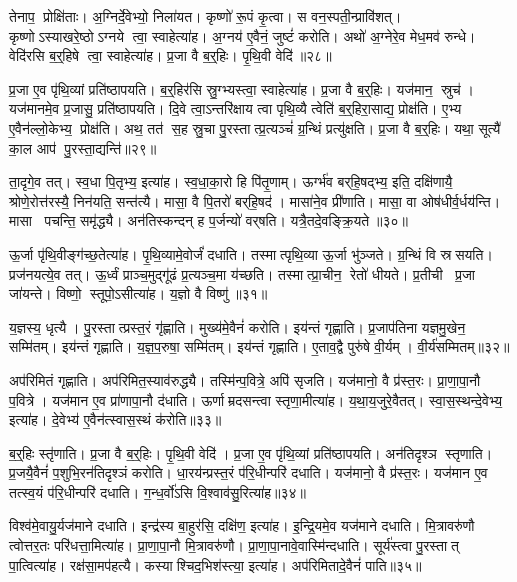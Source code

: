 तेनाप॒ प्रोक्षि॑ताः।
अ॒ग्निर्दे॒वेभ्यो॒ निला॑यत।
कृष्णो॑ रू॒पं कृ॒त्वा।
स वन॒स्पती॒न्प्रावि॑शत्।
कृष्णोऽस्याखरे॒ष्ठोऽग्नये त्वा॒ स्वाहेत्या॑ह।
अ॒ग्नय॑ ए॒वैनं॒ जुष्टं॑ करोति।
अथो॑ अ॒ग्नेरे॒व मेध॒मव॑ रुन्धे।
वेदि॑रसि ब॒र्॒हिषे त्वा॒ स्वाहेत्या॑ह।
प्र॒जा वै ब॒र्॒हिः।
पृ॒थि॒वी वेदि॑॥२८॥

प्र॒जा ए॒व पृ॑थि॒व्यां प्रति॑ष्ठापयति।
ब॒र्॒हिर॑सि स्रु॒ग्भ्यस्त्वा॒ स्वाहेत्या॑ह।
प्र॒जा वै ब॒र्॒हिः।
यज॑मान॒ स्रुच॑।
यज॑मानमे॒व प्र॒जासु॒ प्रति॑ष्ठापयति।
दि॒वे त्वा॒ऽन्तरि॑क्षाय त्वा पृथि॒व्यै त्वेति॑ ब॒र्॒हिरा॒साद्य॒ प्रोक्ष॑ति।
ए॒भ्य ए॒वैन॑ल्लो॒केभ्य॒ प्रोक्ष॑ति।
अथ॒ तत॑ स॒ह स्रु॒चा पु॒रस्तात्प्र॒त्यञ्चं॑ ग्र॒न्थिं प्रत्यु॑क्षति।
प्र॒जा वै ब॒र्॒हिः।
यथा॒ सूत्यै॑ का॒ल आप॑ पु॒रस्ता॒द्यन्ति॑॥२९॥

ता॒दृगे॒व तत्।
स्व॒धा पि॒तृभ्य॒ इत्या॑ह।
स्व॒धा॒का॒रो हि पि॑तृ॒णाम्।
ऊर्ग्भ॑व बर्‌हि॒षद्भ्य॒ इति॒ दक्षि॑णायै॒ श्रोणे॒रोत्त॑रस्यै॒ निन॑यति॒ सन्त॑त्यै।
मासा॒ वै पि॒तरो॑ बर्‌हि॒षद॑।
मासा॑ने॒व प्री॑णाति।
मासा॒ वा ओष॑धीर्व॒र्धय॑न्ति।
मासा पचन्ति॒ समृ॑द्ध्यै।
अन॑तिस्कन्दन् ह प॒र्जन्यो॑ वर्‌षति।
यत्रै॒तदे॒वङ्क्रि॒यते॥३०॥

ऊ॒र्जा पृ॑थि॒वीङ्ग॑च्छ॒तेत्या॑ह।
पृ॒थि॒व्यामे॒वोर्जं॑ दधाति।
तस्मात्पृथि॒व्या ऊ॒र्जा भु॑ञ्जते।
ग्र॒न्थिं वि स्रसयति।
प्रज॑नयत्ये॒व तत्।
ऊ॒र्ध्वं प्राञ्च॒मुद्गू॑ढं प्र॒त्यञ्च॒मा य॑च्छति।
तस्मात्प्रा॒चीन॒ रेतो॑ धीयते।
प्र॒तीची प्र॒जा जा॑यन्ते।
विष्णो॒ स्तूपो॒ऽसीत्या॑ह।
य॒ज्ञो वै विष्णु॑॥३१॥

य॒ज्ञस्य॒ धृत्यै।
पु॒रस्तात्प्रस्त॒रं गृ॑ह्णाति।
मुख्य॑मे॒वैनं॑ करोति।
इय॑न्तं गृह्णाति।
प्र॒जाप॑तिना यज्ञमु॒खेन॒ सम्मि॑तम्।
इय॑न्तं गृह्णाति।
य॒ज्ञ॒प॒रुषा॒ सम्मि॑तम्।
इय॑न्तं गृह्णाति।
ए॒ताव॒द्वै पुरु॑षे वी॒र्यम्।
वी॒र्य॑सम्मितम्॥३२॥

अप॑रिमितं गृह्णाति।
अप॑रिमित॒स्याव॑रुद्ध्यै।
तस्मि॑न्प॒वित्रे॒ अपि॑ सृजति।
यज॑मानो॒ वै प्र॑स्त॒रः।
प्रा॒णा॒पा॒नौ प॒वित्रे।
यज॑मान ए॒व प्रा॑णापा॒नौ द॑धाति।
ऊर्णाम्रदसन्त्वा स्तृणा॒मीत्या॑ह।
य॒था॒य॒जुरे॒वैतत्।
स्वा॒स॒स्थन्दे॒वेभ्य॒ इत्या॑ह।
दे॒वेभ्य॑ ए॒वैन॑त्स्वास॒स्थं क॑रोति॥३३॥

ब॒र्॒हिः स्तृ॑णाति।
प्र॒जा वै ब॒र्॒हिः।
पृ॒थि॒वी वेदि॑।
प्र॒जा ए॒व पृ॑थि॒व्यां प्रति॑ष्ठापयति।
अन॑तिदृश्ञ स्तृणाति।
प्र॒जयै॒वैनं॑ प॒शुभि॒रन॑तिदृश्ञं करोति।
धा॒रय॑न्प्रस्त॒रं प॑रि॒धीन्परि॑ दधाति।
यज॑मानो॒ वै प्र॑स्त॒रः।
यज॑मान ए॒व तत्स्व॒यं प॑रि॒धीन्परि॑ दधाति।
ग॒न्ध॒र्वो॑ऽसि वि॒श्वाव॑सु॒रित्या॑ह॥३४॥

विश्व॑मे॒वायु॒र्यज॑माने दधाति।
इन्द्र॑स्य बा॒हुर॑सि॒ दक्षि॑ण॒ इत्या॑ह।
इ॒न्द्रि॒यमे॒व यज॑माने दधाति।
मि॒त्रावरु॑णौ त्वोत्तर॒तः परि॑धत्ता॒मित्या॑ह।
प्रा॒णा॒पा॒नौ मि॒त्रावरु॑णौ।
प्रा॒णा॒पा॒नावे॒वास्मि॑न्दधाति।
सूर्य॑स्त्वा पु॒रस्तात् पा॒त्वित्या॑ह।
रक्ष॑सा॒मप॑हत्यै।
कस्याश्चिद॒भिश॑स्त्या॒ इत्या॑ह।
अप॑रिमितादे॒वैनं॑ पाति॥३५॥

